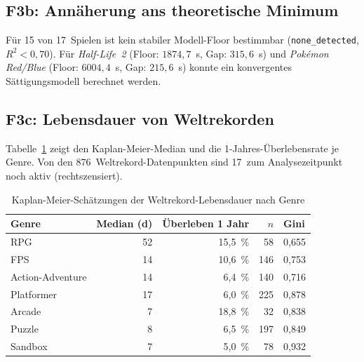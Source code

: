 
\subsection*{F3b: Annäherung ans theoretische Minimum}

Für 15 von 17~Spielen ist kein stabiler Modell-Floor bestimmbar (\texttt{none\_detected}, $R^2 < 0{,}70$). Für \textit{Half-Life~2} (Floor: $1874{,}7$~s, Gap: $315{,}6$~s) und \textit{Pokémon Red/Blue} (Floor: $6004{,}4$~s, Gap: $215{,}6$~s) konnte ein konvergentes Sättigungsmodell berechnet werden.


\subsection*{F3c: Lebensdauer von Weltrekorden}

Tabelle~\ref{tab:q3} zeigt den Kaplan-Meier-Median und die 1-Jahres-Überlebensrate je Genre. Von den 876~Weltrekord-Datenpunkten sind 17~zum Analysezeitpunkt noch aktiv (rechtszensiert).

\begin{table}[htb]
  \centering
  \caption{Kaplan-Meier-Schätzungen der Weltrekord-Lebensdauer nach Genre}
  \label{tab:q3}
  \small
  \begin{tabular}{lrrrl}
    \toprule
    \textbf{Genre} & \textbf{Median (d)} & \textbf{Überleben 1 Jahr} & \textbf{$n$} & \textbf{Gini} \\
    \midrule
    RPG              & 52  & 15,5~\% & 58  & 0,655 \\
    FPS              & 14  & 10,6~\% & 146 & 0,753 \\
    Action-Adventure & 14  & 6,4~\%  & 140 & 0,716 \\
    Platformer       & 17  & 6,0~\%  & 225 & 0,878 \\
    Arcade           & 7   & 18,8~\% & 32  & 0,838 \\
    Puzzle           & 8   & 6,5~\%  & 197 & 0,849 \\
    Sandbox          & 7   & 5,0~\%  & 78  & 0,932 \\
    \bottomrule
  \end{tabular}
\end{table}

